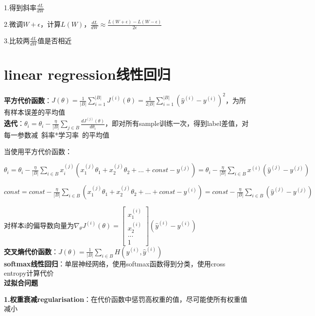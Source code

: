 \documentclass[UTF8]{ctexart}
\begin{document}
  1.得到斜率$\frac{dL}{dW}$

  2.微调$W + \epsilon$，计算$L(W)$，$\frac{dL}{dW} \approx \frac{L(W + \epsilon) - L(W - \epsilon)}{2\epsilon}$

  3.比较两$\frac{dL}{dW}$值是否相近

\section{linear regression线性回归}
\noindent \textbf{平方代价函数}：$J(\theta ) = \frac{1}{|B|} \sum_{i = 1}^{|B|} J^{(i)}(\theta ) = \frac{1}{2|B|} \sum_{i = 1}^{|B|} (\hat{y}^{(i)} - y^{(i)})^2  $，为所有样本误差的平均值\\
\textbf{迭代}：$\theta_i = \theta_i - \frac{\eta}{|B|}\sum_{j\in B} \frac{d J^{(j)}(\theta)}{d \theta_i}$，即对所有sample训练一次，得到label差值，对每一参数减\ 斜率*学习率\ 的平均值
  
  当使用平方代价函数：
  
  \quad $\theta_i = \theta_i - \frac{\eta}{|B|}\sum_{i\in B} x^{(j)}_i(x^{(j)}_1\theta_1 + x^{(j)}_2\theta_2 + ... + const - y^{(j)}) = \theta_i - \frac{\eta}{|B|}\sum_{i\in B}x^{(i)}(\hat{y}^{(j)} - y^{(j)})$

  \quad $const = const - \frac{\eta}{|B|}\sum_{i\in B} (x^{(j)}_1\theta_1 + x^{(j)}_2\theta_2 + ... + const - y^{(i)}) = const - \frac{\eta}{|B|}\sum_{i\in B}(\hat{y}^{(j)} - y^{(j)})$

  \quad 对样本i的偏导数向量为$\nabla _{\theta}J^{(i)}(\theta) = 
    \begin{bmatrix}
    x^{(i)}_1 \\
    x^{(i)}_2 \\
    ... \\
    1
    \end{bmatrix}(\hat{y}^{(i)} - y^{(i)})
    $\\
\textbf{交叉熵代价函数}：$J(\theta) = \frac{1}{|B|}\sum_{i\in B} H(y^{(i)}, \hat{y}^{(i)})$\\
\textbf{softmax线性回归}：单层神经网络，使用softmax函数得到分类，使用cross entropy计算代价\\
\textbf{过拟合问题}

  \textbf{1.权重衰减regularisation}：在代价函数中惩罚高权重的值，尽可能使所有权重值减小
\end{document}
